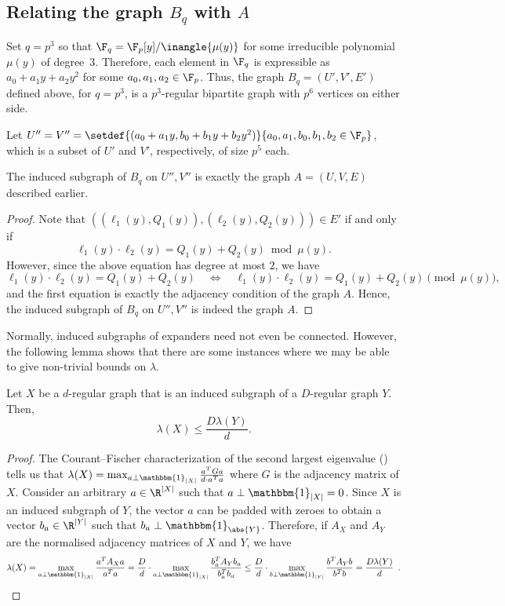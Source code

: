 \documentclass{toc}
\begin{document}
\subsection{Relating the graph $B_q$ with $A$}

Set $q = p^3$ so that %
$\F_q = \F_p[y]/\inangle{\mu(y)}$ %
for some irreducible polynomial $\mu(y)$ of %
%
degree~3.  %
Therefore, each
element in $\F_q$ is expressible as $a_0 + a_1y + a_2 y^2$ for some
$a_0,a_1,a_2\in \F_p$. Thus, the graph $B_q=(U',V',E')$ defined above,
for %
$q = p^3$, is a $p^3$-regular bipartite graph with $p^6$ vertices on either side.

Let $U'' = V'' = \setdef{(a_0 + a_1y , b_0 + b_1y + b_2 y^2)}{a_0,a_1,b_0,b_1,b_2 \in \F_p}$, which is a subset of $U'$ and $V'$, respectively, of size $p^5$ each.

\begin{observation}
  The induced subgraph of $B_q$ on  $U'',V''$ is exactly the graph
  $A=(U,V,E)$ described earlier. 
\end{observation}
\begin{proof}
  Note that $((\ell_1(y),Q_1(y)),(\ell_2(y),Q_2(y))) \in E'$ if and only if
  \[
    \ell_1(y)\cdot \ell_2(y) = Q_1(y) + Q_2(y) \bmod{\mu(y)}. 
  \]
  However, since the above equation has degree at most $2$, we have
  \[
    \ell_1(y)\cdot \ell_2(y) = Q_1(y) + Q_2(y) \quad\Leftrightarrow\quad \ell_1(y)\cdot \ell_2(y) = Q_1(y) + Q_2(y) \pmod{\mu(y)},
  \]
  and the first equation is exactly the adjacency condition of the graph $A$. Hence, the induced subgraph of $B_q$ on $U'',V''$ is indeed the graph $A$. 
\end{proof}

Normally, induced subgraphs of expanders need not even be connected. However, the following lemma shows that there are some instances where we may be able to give non-trivial bounds on $\lambda$.

\begin{lemma}\label{lem:induced-subgraph-eig-bound}
%
Let $X$ be  %
a $d$-regular %
graph that is an induced subgraph of a $D$-regular graph $Y$. Then,
  \[
    \lambda(X) \leq \frac{D \lambda(Y)}{d}. 
  \]
\end{lemma}
\begin{proof} The %
  Courant--Fischer  %
  characterization of the second largest eigenvalue
  ()  %
tells us that \(\lambda(X) = \max_{a \perp \mathbbm{1}_{|X|}} \frac{a^T G a}{d \cdot a^T a}\) where $G$ is the adjacency matrix of $X$.
 Consider an arbitrary $a \in \R^{|X|}$ such that $a \perp \mathbbm{1}_{|X|} = 0$. Since $X$ is an induced subgraph of $Y$, the vector $a$ can be padded with zeroes to obtain a vector $b_a \in \R^{|Y|}$ such that $b_a \perp \mathbbm{1}_{\abs{Y}}$. Therefore, if $A_X$ and $A_Y$ are the normalised adjacency matrices of $X$ and $Y$, we have
\[
   \lambda(X) = \max_{a \perp \mathbbm{1}_{|X|}} \frac{a^T A_X
   a}{a^T a} =  \frac{D}{d}\cdot \max_{a \perp \mathbbm{1}_{|X|}}
   \frac{b_a^T A_Y b_a}{b_a^T b_a}
   \leq \frac{D}{d}\cdot \max_{b \perp \mathbbm{1}_{|Y|}}
   \frac{b^T A_Y b}{b^T b} =
   \frac{D\lambda(Y)}{d} \enspace . \qedhere
 \]
\end{proof}
\end{document}
